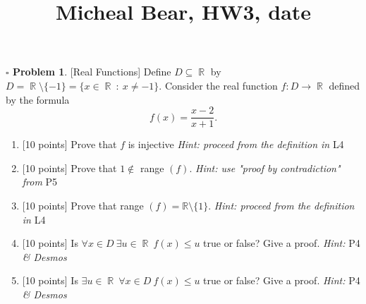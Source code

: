\documentclass[11pt,twoside]{amsart}
\title {Micheal Bear, HW3, date}
\DeclareMathOperator*{\R}{\mathbb{R}} \DeclareMathOperator*{\N}{\mathbb{N}} \DeclareMathOperator*{\Q}{\mathbb{Q}} \DeclareMathOperator*{\Z}{\mathbb{Z}} \DeclareMathOperator*{\E}{\mathbb{E}} \DeclareMathOperator*{\C}{\mathbb{C}} \DeclareMathOperator*{\A}{\mathbb{A}}
\theoremstyle{definition}
\newtheorem{bprob}{$\square$ Problem}
\begin{document}
	\maketitle	
  
 \begin{bprob}
  [\textsf{Real Functions}] Define $D \subseteq \R$ by $D = \R \setminus \{-1\} = \{ x \in \R \ : \ x \neq -1 \}.$ Consider the real function $f: D \rightarrow \R$ defined by the formula $$f(x) = \frac{x-2}{x+    1}.$$

  \begin{enumerate}[label= 1.\arabic*, itemsep=0.2cm]
    \item {[10 points]} Prove that $f$ is injective 
     \textit{Hint: proceed from the definition in }\textsf{L4} 
    \item {[10 points]} Prove that $1 \not \in$ range $(f)$.
 \textit{Hint: use "proof by contradiction" from }\textsf{P5}
    \item {[10 points]} Prove that range $(f) = \mathbb{R} \setminus \{1\}$.
    \textit{Hint: proceed from the definition in }\textsf{L4}
    \item {[10 points]} Is $\forall x \in D \ \exists u \in \R \ f(x) \leq u$ true or false? Give a proof.
      \textit{Hint:} \textsf{P4} \textit{\& Desmos}
    \item {[10 points]} Is $\exists u \in \R \ \forall x \in D \ f(x) \leq u$ true or false? Give a proof.
      \textit{Hint:} \textsf{P4} \textit{\& Desmos}
 \end{enumerate} 
\end{bprob}
\end{document}
